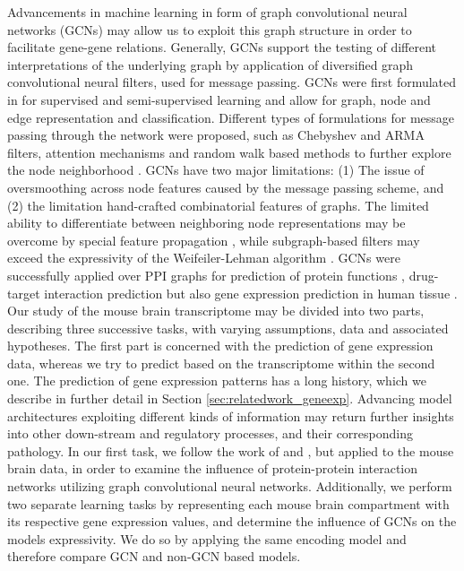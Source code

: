 \documentclass[]{article}
\renewcommand{\cite}{\citep}
\begin{document}
Advancements in machine learning in form of graph convolutional neural networks (GCNs) may allow us to exploit this graph structure in order to facilitate gene-gene relations. Generally, GCNs support the testing of different interpretations of the underlying graph by application of diversified graph convolutional neural filters, used for message passing. GCNs were first formulated in \citet{GCNConv} for supervised and semi-supervised learning and allow for graph, node and edge representation and classification. Different types of formulations for message passing through the network were proposed, such as Chebyshev \cite{ChebConv} and ARMA \cite{ArmaConv} filters, attention mechanisms \cite{GATConv} and random walk based methods to further explore the node neighborhood \cite{APPNPConv, SAGEConv}. GCNs have two major limitations: (1) The issue of oversmoothing across node features caused by the message passing scheme, and (2) the limitation hand-crafted combinatorial features of graphs. The limited ability to differentiate between neighboring node representations may be overcome by special feature propagation \cite{GENConv2020}, while subgraph-based filters \citet{feng2022kergnns} may exceed the expressivity of the Weifeiler-Lehman algorithm \cite{leman1968reduction}. 
GCNs were successfully applied over PPI graphs for prediction of  protein functions \cite{Zitnik2017}, drug-target interaction prediction \cite{hinnerichs2021dti} but also gene expression prediction in human tissue \cite{schulte2021integration, wang2021mogonet}.\\ 

Our study of the mouse brain transcriptome may be divided into two parts, describing three successive tasks, with varying assumptions, data and associated hypotheses. 
The first part is concerned with the prediction of gene expression data, whereas we try to predict based on the transcriptome within the second one. 
The prediction of gene expression patterns has a long history, which we describe in further detail in Section \ref{sec:relatedwork_geneexp}. Advancing model architectures exploiting different kinds of information may return further insights into other down-stream and regulatory processes, and their corresponding pathology. In our first task, we follow the work of \citet{wang2021mogonet} and \citet{schulte2021integration}, but applied to the mouse brain data, in order to examine the influence of protein-protein interaction networks utilizing graph convolutional neural networks. 
Additionally, we perform two separate learning tasks by representing each mouse brain compartment with its respective gene expression values, and determine the influence of GCNs on the models expressivity. We do so by applying the same encoding model and therefore compare GCN and non-GCN based models.
\end{document}
